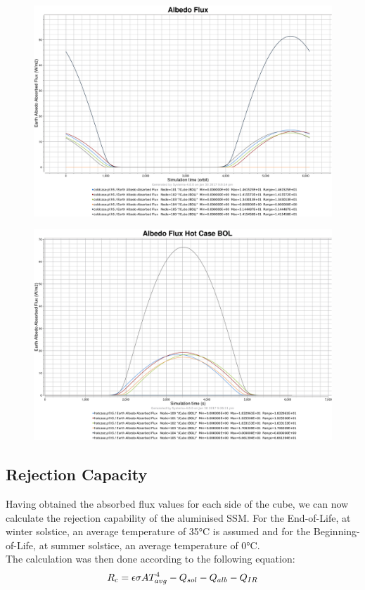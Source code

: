 \begin{figure}[h!]
\centering
  \centering
  \includegraphics[width=0.7\linewidth]{images/albedo_flux_coldCase_BOL}
  \label{fig:coldcase_alb}
\end{figure}
\begin{figure}[h!]
  \centering
  \includegraphics[width=0.7\linewidth]{images/albedo_flux_hotcase_BOL}
  \label{fig:hotcase_alb}
\end{figure}

\newpage

\subsection{Rejection Capacity}
Having obtained the absorbed flux values for each side of the cube, we can now calculate the rejection capability of the aluminised SSM. For the End-of-Life, at winter solstice, an average temperature of 35°C is assumed and for the Beginning-of-Life, at summer solstice, an average temperature of 0°C.\\
The calculation was then done according to the following equation:
\begin{equation}
\centering
	R_c = \epsilon \sigma A T_{avg}^4 - Q_{sol} - Q_{alb} - Q_{IR}
	\label{eq:rejcap}
\end{equation}

